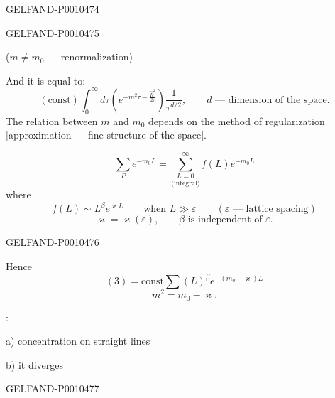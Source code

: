 \begin{GelfandAdjacentEvidence}{GELFAND-P001047}{4}

\end{GelfandAdjacentEvidence}
\begin{GelfandAdjacentEvidence}{GELFAND-P001047}{5}


($m\ne m_0$ — renormalization)

And it is equal to:
\begin{equation*}
(\mathrm{const})\int_0^\infty d\tau
\left(e^{-m^2\tau-\frac{\vec R^{2}}{2\tau}}\right)\frac1{\tau^{d/2}},
\qquad d\text{ — dimension of the space}.
\tag{2'}
\end{equation*}
The relation between $m$ and $m_0$ depends on the method of regularization [approximation — fine structure of the space].

\begin{equation*}
\sum_P e^{-m_0L}=
\underset{\text{(integral)}}{\sum_{L=0}^{\infty}} f(L)e^{-m_0L}
\tag{3}
\end{equation*}
where
\[
f(L)\sim L^\beta e^{\varkappa L}
\qquad\text{when }L\gg\varepsilon
\qquad(\varepsilon\text{ — lattice spacing})
\]
\[
\varkappa=\varkappa(\varepsilon),\qquad\beta\text{ is independent of }\varepsilon.
\]
\end{GelfandAdjacentEvidence}
\begin{GelfandAdjacentEvidence}{GELFAND-P001047}{6}


Hence
\begin{equation*}
(3)=\mathrm{const}\sum(L)^\beta e^{-(m_0-\varkappa)L}
\tag{4}
\end{equation*}
\[
m^2=m_0-\varkappa.
\]

:

a) concentration on straight lines

b) it diverges

\end{GelfandAdjacentEvidence}
\begin{GelfandAdjacentEvidence}{GELFAND-P001047}{7}

\end{GelfandAdjacentEvidence}



